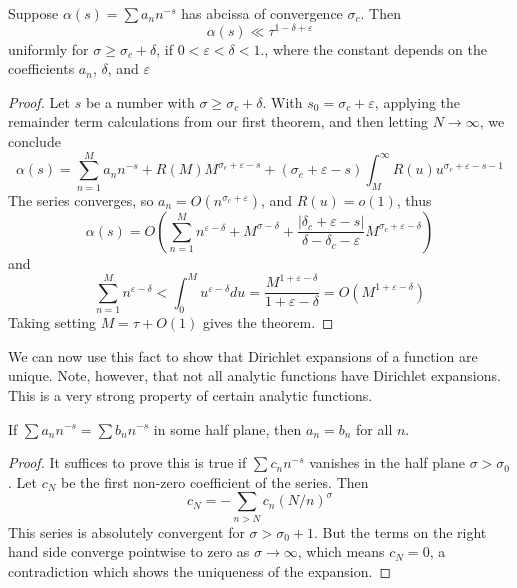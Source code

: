 \begin{theorem}
    Suppose $\alpha(s) = \sum a_n n^{-s}$ has abcissa of convergence $\sigma_c$. Then
    \[ \alpha(s) \ll \tau^{1 - \delta + \varepsilon} \]
    uniformly for $\sigma \geq \sigma_c + \delta$, if $0 < \varepsilon < \delta < 1$., where the constant depends on the coefficients $a_n$, $\delta$, and $\varepsilon$
\end{theorem}
\begin{proof}
    Let $s$ be a number with $\sigma \geq \sigma_c + \delta$. With $s_0 = \sigma_c + \varepsilon$, applying the remainder term calculations from our first theorem, and then letting $N \to \infty$, we conclude
    \[ \alpha(s) = \sum_{n = 1}^M a_n n^{-s} + R(M) M^{\sigma_c + \varepsilon - s} + (\sigma_c + \varepsilon - s) \int_M^\infty R(u) u^{\sigma_c + \varepsilon - s - 1} \]
    The series converges, so $a_n = O(n^{\sigma_c + \varepsilon})$, and $R(u) = o(1)$, thus
    \[ \alpha(s) = O \left( \sum_{n = 1}^M n^{\varepsilon - \delta} + M^{\sigma - \delta} + \frac{|\delta_c + \varepsilon - s|}{\delta - \delta_c - \varepsilon} M^{\sigma_c + \varepsilon - \delta} \right) \]
    and
    \[ \sum_{n = 1}^M n^{\varepsilon - \delta} < \int_0^M u^{\varepsilon - \delta} du = \frac{M^{1 + \varepsilon - \delta}}{1 + \varepsilon - \delta} = O \left( M^{1 + \varepsilon - \delta} \right) \]
    Taking setting $M = \tau + O(1)$ gives the theorem.
\end{proof}

We can now use this fact to show that Dirichlet expansions of a function are unique. Note, however, that not all analytic functions have Dirichlet expansions. This is a very strong property of certain analytic functions.

\begin{theorem}
    If $\sum a_n n^{-s} = \sum b_n n^{-s}$ in some half plane, then $a_n = b_n$ for all $n$.
\end{theorem}
\begin{proof}
    It suffices to prove this is true if $\sum c_n n^{-s}$ vanishes in the half plane $\sigma > \sigma_0$. Let $c_N$ be the first non-zero coefficient of the series. Then
    \[ c_N = - \sum_{n > N} c_n (N/n)^\sigma \]
    This series is absolutely convergent for $\sigma > \sigma_0 + 1$. But the terms on the right hand side converge pointwise to zero as $\sigma \to \infty$, which means $c_N = 0$, a contradiction which shows the uniqueness of the expansion.
\end{proof}

